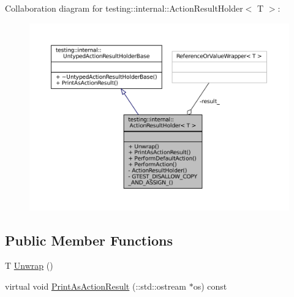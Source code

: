 Collaboration diagram for testing\+:\+:internal\+:\+:Action\+Result\+Holder$<$ T $>$\+:
\nopagebreak
\begin{figure}[H]
\begin{center}
\leavevmode
\includegraphics[width=350pt]{classtesting_1_1internal_1_1ActionResultHolder__coll__graph}
\end{center}
\end{figure}
\subsection*{Public Member Functions}
\begin{DoxyCompactItemize}
\item 
T \hyperlink{classtesting_1_1internal_1_1ActionResultHolder_a057df6cceeeab9ea06e679bcf6b78960}{Unwrap} ()
\item 
virtual void \hyperlink{classtesting_1_1internal_1_1ActionResultHolder_a06d1fb40fc863328dbcc102bc46dece4}{Print\+As\+Action\+Result} (\+::std\+::ostream $\ast$os) const
\end{DoxyCompactItemize}
